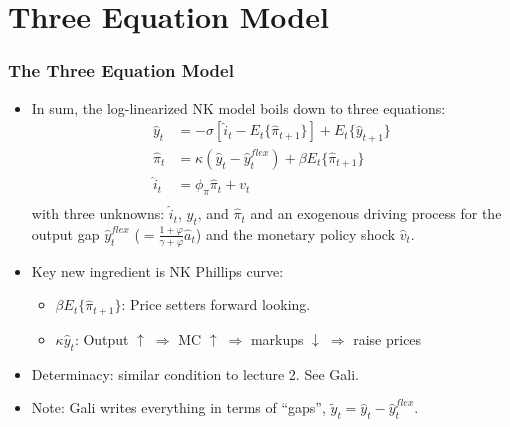 \documentclass[english,xcolor=svgnames]{beamer}
\begin{document}
\section{Three Equation Model}

\begin{frame}
\frametitle{The Three Equation Model}
\begin{itemize}
	\item In sum, the log-linearized NK model boils down to three equations:
	\begin{align*}
		\hat{y}_t &=-\sigma[\hat{i}_t-E_t\{\hat{\pi}_{t+1}\}]+E_t\{\hat{y}_{t+1}\} \\
		\hat{\pi}_t&=\kappa (\hat{y}_t-\hat{y}_t^{flex}) +\beta E_t \{\hat{\pi}_{t+1}\} \\
		\hat{i}_t&=\phi_\pi\hat{\pi}_t+v_t \\
	\end{align*}
	with three unknowns: $\hat{i}_t$, $\hat{y}_t$, and $\hat{\pi}_t$  and an exogenous driving
process for the output gap $\hat{y}_t^{flex}$ ($=\frac{1+\varphi}{\gamma+\varphi}\hat{a}_t$) and the monetary policy shock $\hat{v}_t$.
	\item Key new ingredient is NK Phillips curve:
	\begin{itemize}
		\item $\beta E_t \{\hat{\pi}_{t+1}\}$: Price setters forward looking.
		\item $\kappa\hat{y}_t$: Output  $\uparrow\;\Rightarrow$ MC $\uparrow\;\Rightarrow$ markups $\downarrow\;\Rightarrow$ raise prices
	\end{itemize}
	\item Determinacy: similar condition to lecture 2. See Gali.
	\item Note: Gali writes everything in terms of ``gaps'', $\tilde{y}_t = \hat{y}_t-\hat{y}_t^{flex}$.
\end{itemize}
\end{frame}
\end{document}
